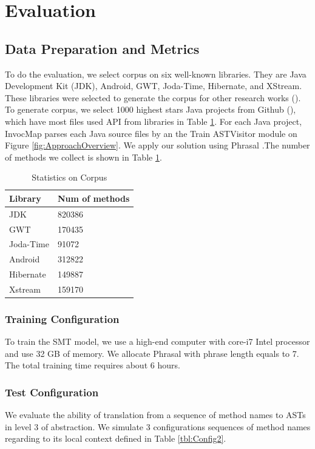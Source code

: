\section{Evaluation}
\subsection{Data Preparation and Metrics}
To do the evaluation, we select corpus on six well-known libraries. They are Java Development Kit (JDK), Android, GWT, Joda-Time, Hibernate, and XStream. These libraries were selected to generate the corpus for other research works (\cite{8453132,Subramanian:2014:LAD:2568225.2568313}). To generate corpus, we select 1000 highest stars Java projects from Github (\cite{id:Github}), which have most files used API from libraries in Table \ref{tbl:DataPreparation}. For each Java project, InvocMap parses each Java source files by an the Train ASTVisitor module on Figure \ref{fig:ApproachOverview}. We apply our solution using Phrasal \cite{Green2014}.The number of methods we collect is shown in Table \ref{tbl:DataPreparation}. 
\begin{table}[]
\small
\centering
\caption{Statistics on Corpus}
\begin{tabular}{|l|l|}
\hline
\textbf{Library }  & \textbf{Num of methods} \\ \hline
JDK       & 820386         \\ \hline
GWT       & 170435         \\ \hline
Joda-Time & 91072          \\ \hline
Android   & 312822         \\ \hline
Hibernate & 149887         \\ \hline
Xstream   & 159170         \\ \hline
\end{tabular}

\label{tbl:DataPreparation}
\end{table}

\subsubsection{Training Configuration} To train the SMT model, we use a high-end computer with core-i7 Intel processor and use 32 GB of memory. We allocate Phrasal with phrase length equals to 7. The total training time requires about 6 hours.

\subsubsection{Test Configuration}
We evaluate the ability of translation from a sequence of method names to ASTs in level 3 of abstraction. We simulate 3 configurations sequences of method names regarding to its local context defined in Table \ref{tbl:Config2}. 

